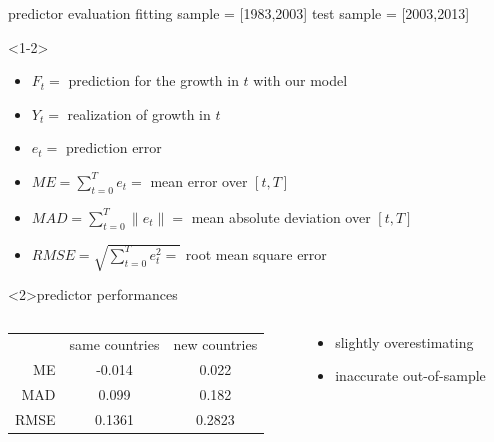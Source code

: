 \documentclass[9pt]{beamer}
\begin{document}
\begin{frame}{predictor evaluation}
	fitting sample = [1983,2003] \qquad test sample = [2003,2013]
	\begin{definition}<1-2>
		\begin{itemize}
			\item $F_t =$ prediction for the growth in $t$ with our model
			\item $Y_t =$ realization of growth in $t$
			\item $e_t =$ prediction error
			\item $ME = \sum_{t=0}^{T}e_t =$ mean error over $[t,T]$
			\item $MAD = \sum_{t=0}^{T}\|e_t\| = $ mean absolute deviation over $[t,T]$
			\item $ RMSE = \sqrt{\sum_{t=0}^{T}e_t^{2} =}$ root mean square error
		\end{itemize}
		
	\end{definition}
	\begin{block}{predictor performances}
	\begin{columns}
		\begin{column}{5cm}
		\begin{tabular}{ r|c|c| }
			\multicolumn{1}{r}{}
			&  \multicolumn{1}{c}{same countries}
			& \multicolumn{1}{c}{new countries} \\
			\cline{2-3}
			ME & -0.014 & 0.022 \\
			\cline{2-3}
			MAD & 0.099 & 0.182 \\
			\cline{2-3}
			RMSE & 0.1361 & 0.2823 \\
			\cline{2-3}
		\end{tabular}
	\end{column}
	\begin{column}{3cm}
		\begin{itemize}
			\item slightly overestimating
			\item inaccurate out-of-sample
		\end{itemize}
	\end{column}
    \end{columns}
	\end{block}	
	
	
\end{frame}
\end{document}
